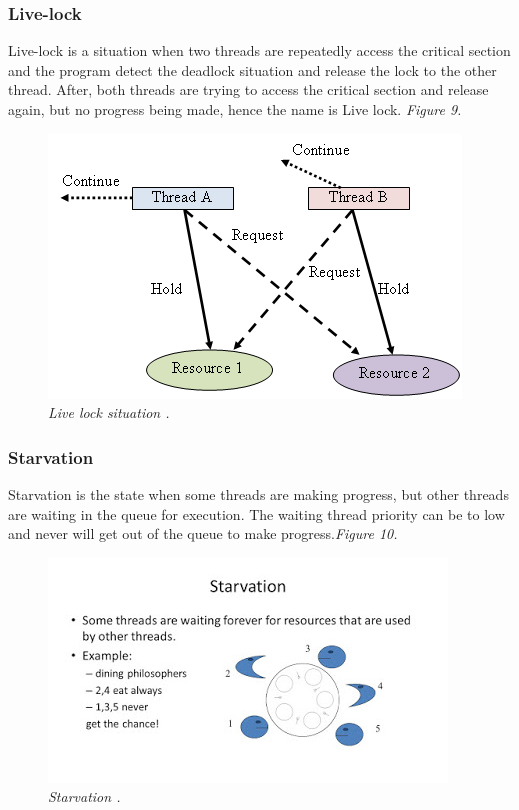 \documentclass[12pt]{article}
\begin{document}
	\subsubsection{Live-lock}
Live-lock is a  situation when two threads are repeatedly access the critical section and the program detect the deadlock situation and release the lock to the other thread. After, both threads are trying to access the critical section and release again, but no progress being made, hence the name is Live lock. \textit{\color{gray}Figure 9.}

\begin{figure}[h!]
\centering
\includegraphics[scale=0.5]{Pictures/livelock.png}
\caption{\textit{\color{gray}Live lock situation \cite{installsetupconfig}.}}
\end{figure}

	\subsubsection{Starvation}
Starvation is the state when some threads are making progress, but other threads are waiting in the queue for execution. The waiting thread priority can be to low and never will get out of the queue to make progress.\textit{\color{gray}Figure 10.}

\begin{figure}[h!]
\centering
\includegraphics[scale=0.6]{Pictures/starvation.jpg}
\caption{\textit{\color{gray}Starvation \cite{Sitansu}.}}
\end{figure}
\clearpage
\end{document}
